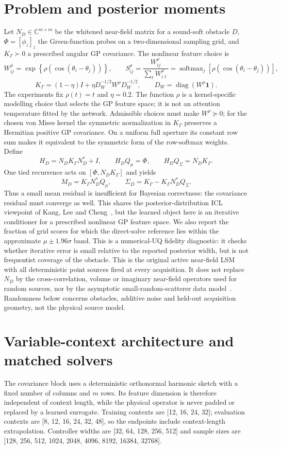 \documentclass[10pt]{article}
\DeclareMathOperator{\softmax}{softmax}
\begin{document}
\section{Problem and posterior moments}
Let $N_D\in\mathbb C^{m\times m}$ be the whitened near-field matrix for a
sound-soft obstacle $D$, $\Phi=[\phi_z]_z$ the Green-function probes on a
two-dimensional sampling grid, and $K_\Gamma\succ0$ a prescribed angular GP
covariance.  The nonlinear feature choice is
\[
 W^\rho_{ij}=\exp\!\left\{\rho(\cos(\theta_i-\theta_j))\right\},
 \qquad
 S^\rho_{ij}=\frac{W^\rho_{ij}}{\sum_\ell W^\rho_{i\ell}}
 =\softmax_j\!\left[\rho(\cos(\theta_i-\theta_j))\right],
 \]
 \[
 K_\Gamma=(1-\eta)I+\eta D_W^{-1/2}W^\rho D_W^{-1/2},
 \qquad D_W=\operatorname{diag}(W^\rho\mathbf 1).
\]
The experiments fix $\rho(t)=t$ and $\eta=0.2$.  The function $\rho$ is a
kernel-specific modelling choice that selects the GP feature space; it is not
an attention temperature fitted by the network.  Admissible choices must make
$W^\rho\succeq0$; for the chosen von Mises kernel the symmetric normalization
in $K_\Gamma$ preserves a Hermitian positive GP covariance.  On a uniform full
aperture its constant row sum makes it equivalent to the symmetric form of
the row-softmax weights.  Define
\[
 H_D=N_DK_\Gamma N_D^*+I,\qquad
 H_DQ_\mu=\Phi,\qquad H_DQ_\Sigma=N_DK_\Gamma.
\]
One tied recurrence acts on $[\Phi,N_DK_\Gamma]$ and yields
\[
 M_D=K_\Gamma N_D^*Q_\mu,\qquad
 \Sigma_D=K_\Gamma-K_\Gamma N_D^*Q_\Sigma.
\]
Thus a small mean residual is insufficient for Bayesian correctness: the
covariance residual must converge as well.
This shares the posterior-distribution ICL viewpoint of
Kang, Lee and Cheng~\cite{kang2026}, but the learned object here is an
iterative conditioner for a prescribed nonlinear GP feature space.
We also report the fraction of grid scores for which the direct-solve reference
lies within the approximate $\mu\pm1.96\sigma$ band.  This is a numerical-UQ
fidelity diagnostic: it checks whether iterative error is small relative to
the reported posterior width, but is not frequentist coverage of the obstacle.
This is the original active near-field LSM with all deterministic point
sources fired at every acquisition.  It does not replace $N_D$ by the
cross-correlation, volume or imaginary near-field operators used for random
sources, nor by the asymptotic small-random-scatterer data
model~\cite{garnier2022,garnier2024}.  Randomness
below concerns obstacles, additive noise and held-out acquisition geometry,
not the physical source model.

\section{Variable-context architecture and matched solvers}
The covariance block uses a deterministic orthonormal harmonic sketch with a
fixed number of columns and $m$ rows.  Its feature dimension is therefore
independent of context length, while the physical operator is never padded or
replaced by a learned surrogate.  Training contexts are
[12, 16, 24, 32]; evaluation contexts are
[8, 12, 16, 24, 32, 48], so the endpoints include context-length
extrapolation.  Controller widths are [32, 64, 128, 256, 512] and sample
sizes are [128, 256, 512, 1024, 2048, 4096, 8192, 16384, 32768].
\end{document}
